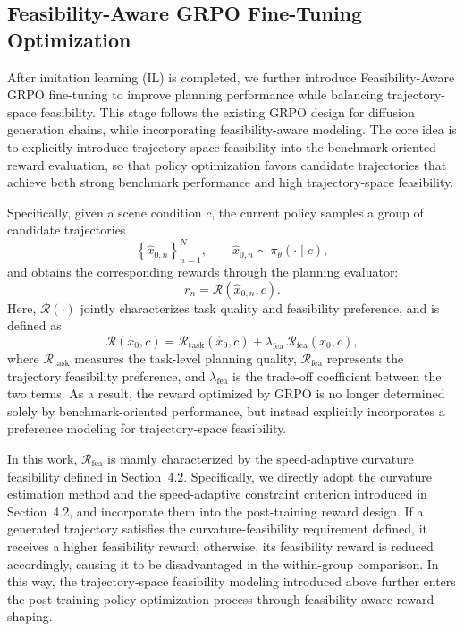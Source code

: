 \documentclass[3p,times,authoryear]{elsarticle}
\begin{document}
\subsection{Feasibility-Aware GRPO Fine-Tuning Optimization}

After imitation learning (IL) is completed, we further introduce Feasibility-Aware GRPO fine-tuning to improve planning performance while balancing trajectory-space feasibility. This stage follows the existing GRPO design for diffusion generation chains, while incorporating feasibility-aware modeling. The core idea is to explicitly introduce trajectory-space feasibility into the benchmark-oriented reward evaluation, so that policy optimization favors candidate trajectories that achieve both strong benchmark performance and high trajectory-space feasibility.

Specifically, given a scene condition \(c\), the current policy samples a group of candidate trajectories
\begin{equation}
\left\{ \hat{x}_{0,n} \right\}_{n=1}^{N},
\qquad
\hat{x}_{0,n} \sim \pi_{\theta}(\cdot \mid c),
\end{equation}
and obtains the corresponding rewards through the planning evaluator:
\begin{equation}
r_{n} = \mathcal{R}\!\left(\hat{x}_{0,n}, c\right).
\end{equation}
Here, \(\mathcal{R}(\cdot)\) jointly characterizes task quality and feasibility preference, and is defined as
\begin{equation}
\mathcal{R}\left(\hat{x}_{0}, c\right)
=
\mathcal{R}_{\mathrm{task}}\left(\hat{x}_{0}, c\right)
+
\lambda_{\mathrm{fea}} \, \mathcal{R}_{\mathrm{fea}}\left(\hat{x}_{0}, c\right),
\end{equation}
where $\mathcal{R}_{\mathrm{task}}$ measures the task-level planning quality, $\mathcal{R}_{\mathrm{fea}}$ represents the trajectory feasibility preference, and $\lambda_{\mathrm{fea}}$ is the trade-off coefficient between the two terms. As a result, the reward optimized by GRPO is no longer determined solely by benchmark-oriented performance, but instead explicitly incorporates a preference modeling for trajectory-space feasibility.

In this work, $\mathcal{R}_{\mathrm{fea}}$ is mainly characterized by the speed-adaptive curvature feasibility defined in Section~4.2. Specifically, we directly adopt the curvature estimation method and the speed-adaptive constraint criterion introduced in Section~4.2, and incorporate them into the post-training reward design. If a generated trajectory satisfies the curvature-feasibility requirement defined, it receives a higher feasibility reward; otherwise, its feasibility reward is reduced accordingly, causing it to be disadvantaged in the within-group comparison. In this way, the trajectory-space feasibility modeling introduced above further enters the post-training policy optimization process through feasibility-aware reward shaping.
\end{document}
